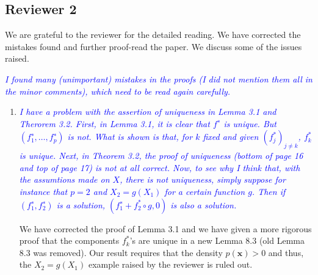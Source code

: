 \documentclass[pdftex,12pt]{article}
\def\E{{\mathbb E}}
\def\rc#1{{\it\textcolor{blue}{#1}}\smallskip}
\begin{document}
\subsection*{Reviewer 2}


We are grateful to the reviewer for the detailed reading. We have corrected the mistakes found and further proof-read the paper. We discuss some of the issues raised. 

\rc{I found many (unimportant) mistakes in the proofs (I
  did not mention them all in the minor comments), which need to be
  read again carefully.}

\begin{enumerate}
\item \rc{I have a problem with the assertion of
  uniqueness in Lemma 3.1 and Therorem 3.2. First, in Lemma 3.1, it is
  clear that $f^∗$ is unique. But $(f_1^∗, \ldots, f_p^∗)$ is not. What is
  shown is that, for $k$ fixed and given $(f_j^*)_{j\neq k}$, $f_k^*$ is unique. Next,
  in Theorem 3.2, the proof of uniqueness (bottom of page 16 and top
  of page 17) is not at all correct.
   Now, to see why I think that, with the assumtions made on $X$, there is
   not uniqueness, simply suppose for instance that $p = 2$ and $X_2 = g(X_1)$
   for a certain function $g$. Then if $(f_1^∗, f_2^∗)$ is a solution,
   $(f_1^∗ + f_2^* \circ g, 0)$ is also a solution.}


We have corrected the proof of Lemma 3.1 and we have given a more rigorous proof that the components $f^*_k$'s are unique in a new Lemma 8.3 (old Lemma 8.3 was removed). Our result requires that the density $p(\mathbf{x}) > 0$ and thus, the $X_2 = g(X_1)$ example raised by the reviewer is ruled out. 






\end{enumerate}
\end{document}
